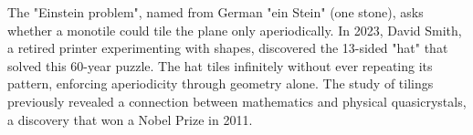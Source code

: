 The "Einstein problem", named from German "ein Stein" (one stone), asks whether a monotile could tile the plane only aperiodically. In 2023, David Smith, a retired printer experimenting with shapes, discovered the 13-sided "hat" that solved this 60-year puzzle. The hat tiles infinitely without ever repeating its pattern, enforcing aperiodicity through geometry alone. The study of tilings previously revealed a connection between mathematics and physical quasicrystals, a discovery that won a Nobel Prize in 2011.

